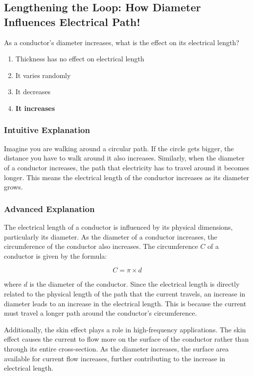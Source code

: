 \subsection{Lengthening the Loop: How Diameter Influences Electrical Path!}

\begin{tcolorbox}[colback=gray!10!white,colframe=black!75!black,title=E5D10] As a conductor’s diameter increases, what is the effect on its electrical length?
    \begin{enumerate}[label=\Alph*.]
        \item Thickness has no effect on electrical length
        \item It varies randomly
        \item It decreases
        \item \textbf{It increases}
    \end{enumerate}
\end{tcolorbox}

\subsubsection{Intuitive Explanation}
Imagine you are walking around a circular path. If the circle gets bigger, the distance you have to walk around it also increases. Similarly, when the diameter of a conductor increases, the path that electricity has to travel around it becomes longer. This means the electrical length of the conductor increases as its diameter grows.

\subsubsection{Advanced Explanation}
The electrical length of a conductor is influenced by its physical dimensions, particularly its diameter. As the diameter of a conductor increases, the circumference of the conductor also increases. The circumference \( C \) of a conductor is given by the formula:

\[
C = \pi \times d
\]

where \( d \) is the diameter of the conductor. Since the electrical length is directly related to the physical length of the path that the current travels, an increase in diameter leads to an increase in the electrical length. This is because the current must travel a longer path around the conductor's circumference.

Additionally, the skin effect plays a role in high-frequency applications. The skin effect causes the current to flow more on the surface of the conductor rather than through its entire cross-section. As the diameter increases, the surface area available for current flow increases, further contributing to the increase in electrical length.

